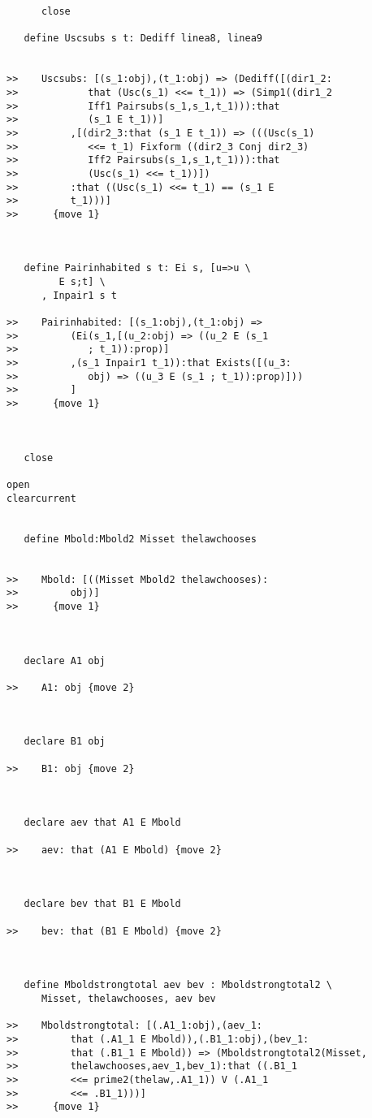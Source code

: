 \documentclass[12pt]{article}
\begin{document}
\begin{verbatim}
      close

   define Uscsubs s t: Dediff linea8, linea9


>>    Uscsubs: [(s_1:obj),(t_1:obj) => (Dediff([(dir1_2:
>>            that (Usc(s_1) <<= t_1)) => (Simp1((dir1_2
>>            Iff1 Pairsubs(s_1,s_1,t_1))):that
>>            (s_1 E t_1))]
>>         ,[(dir2_3:that (s_1 E t_1)) => (((Usc(s_1)
>>            <<= t_1) Fixform ((dir2_3 Conj dir2_3)
>>            Iff2 Pairsubs(s_1,s_1,t_1))):that
>>            (Usc(s_1) <<= t_1))])
>>         :that ((Usc(s_1) <<= t_1) == (s_1 E
>>         t_1)))]
>>      {move 1}



   define Pairinhabited s t: Ei s, [u=>u \
         E s;t] \
      , Inpair1 s t

>>    Pairinhabited: [(s_1:obj),(t_1:obj) =>
>>         (Ei(s_1,[(u_2:obj) => ((u_2 E (s_1
>>            ; t_1)):prop)]
>>         ,(s_1 Inpair1 t_1)):that Exists([(u_3:
>>            obj) => ((u_3 E (s_1 ; t_1)):prop)]))
>>         ]
>>      {move 1}



   close

open
clearcurrent


   define Mbold:Mbold2 Misset thelawchooses


>>    Mbold: [((Misset Mbold2 thelawchooses):
>>         obj)]
>>      {move 1}



   declare A1 obj

>>    A1: obj {move 2}



   declare B1 obj

>>    B1: obj {move 2}



   declare aev that A1 E Mbold

>>    aev: that (A1 E Mbold) {move 2}



   declare bev that B1 E Mbold

>>    bev: that (B1 E Mbold) {move 2}



   define Mboldstrongtotal aev bev : Mboldstrongtotal2 \
      Misset, thelawchooses, aev bev

>>    Mboldstrongtotal: [(.A1_1:obj),(aev_1:
>>         that (.A1_1 E Mbold)),(.B1_1:obj),(bev_1:
>>         that (.B1_1 E Mbold)) => (Mboldstrongtotal2(Misset,
>>         thelawchooses,aev_1,bev_1):that ((.B1_1
>>         <<= prime2(thelaw,.A1_1)) V (.A1_1
>>         <<= .B1_1)))]
>>      {move 1}




\end{verbatim}
\end{document}

